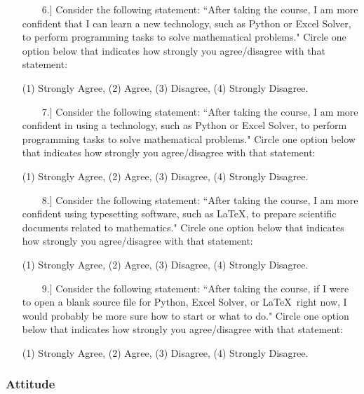\documentclass[11pt]{article}
\begin{document}
\begin{enumerate}


\item[{$\qquad 6.]$}] Consider the following statement: ``After taking the course, I am more confident that I can learn a new technology, such as Python or Excel Solver, to perform programming tasks to solve mathematical problems."  Circle one option below that indicates how strongly you agree/disagree with that statement:  
\begin{center} 
(1) Strongly Agree, \qquad (2) Agree, \qquad (3) Disagree, \qquad (4) Strongly Disagree. \end{center}


\item[{$\qquad 7.]$}] Consider the following statement: ``After taking the course, I am more confident in using a technology, such as Python or Excel Solver, to perform programming tasks to solve mathematical problems."  Circle one option below that indicates how strongly you agree/disagree with that statement:  
\begin{center} 
(1) Strongly Agree, \qquad (2) Agree, \qquad (3) Disagree, \qquad (4) Strongly Disagree. \end{center}


\item[{$\qquad 8.]$}] Consider the following statement: ``After taking the course, I am more confident using typesetting software, such as \LaTeX, to prepare scientific documents related to mathematics."  Circle one option below that indicates how strongly you agree/disagree with that statement:  
\begin{center} 
(1) Strongly Agree, \qquad (2) Agree, \qquad (3) Disagree, \qquad (4) Strongly Disagree. \end{center}

\item[{$\qquad 9.]$}] Consider the following statement: ``After taking the course, if I were to open a blank source file for Python, Excel Solver, or \LaTeX\, right now, I would probably be more sure how to start or what to do."  Circle one option below that indicates how strongly you agree/disagree with that statement:  
\begin{center} 
(1) Strongly Agree, \qquad (2) Agree, \qquad (3) Disagree, \qquad (4) Strongly Disagree. \end{center}


\end{enumerate}

\subsubsection*{Attitude}
\end{document}
